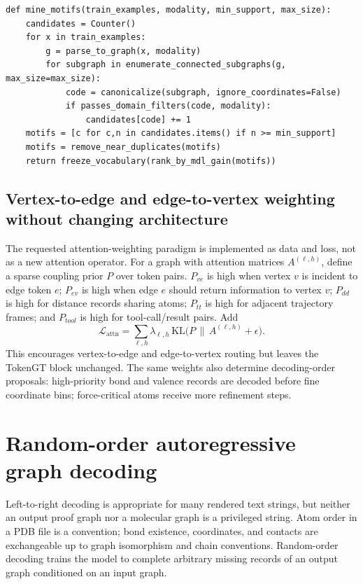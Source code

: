 \documentclass[11pt]{article}
\newcommand{\1}{\mathbf{1}}
\begin{document}
\begin{lstlisting}[caption={Leakage-safe motif mining.}]
def mine_motifs(train_examples, modality, min_support, max_size):
    candidates = Counter()
    for x in train_examples:
        g = parse_to_graph(x, modality)
        for subgraph in enumerate_connected_subgraphs(g, max_size=max_size):
            code = canonicalize(subgraph, ignore_coordinates=False)
            if passes_domain_filters(code, modality):
                candidates[code] += 1
    motifs = [c for c,n in candidates.items() if n >= min_support]
    motifs = remove_near_duplicates(motifs)
    return freeze_vocabulary(rank_by_mdl_gain(motifs))
\end{lstlisting}

\subsection{Vertex-to-edge and edge-to-vertex weighting without changing architecture}

The requested attention-weighting paradigm is implemented as data and loss, not as a new attention operator. For a graph with attention matrices $A^{(\ell,h)}$, define a sparse coupling prior $P$ over token pairs. $P_{ve}$ is high when vertex $v$ is incident to edge token $e$; $P_{ev}$ is high when edge $e$ should return information to vertex $v$; $P_{dd}$ is high for distance records sharing atoms; $P_{tt}$ is high for adjacent trajectory frames; and $P_{tool}$ is high for tool-call/result pairs. Add
\[
  \mathcal L_{\mathrm{attn}} = \sum_{\ell,h}\lambda_{\ell,h}\,\mathrm{KL}\big(P\,\|\,A^{(\ell,h)}+\epsilon\big).
\]
This encourages vertex-to-edge and edge-to-vertex routing but leaves the TokenGT block unchanged. The same weights also determine decoding-order proposals: high-priority bond and valence records are decoded before fine coordinate bins; force-critical atoms receive more refinement steps.

\section{Random-order autoregressive graph decoding}

Left-to-right decoding is appropriate for many rendered text strings, but neither an output proof graph nor a molecular graph is a privileged string. Atom order in a PDB file is a convention; bond existence, coordinates, and contacts are exchangeable up to graph isomorphism and chain conventions. Random-order decoding trains the model to complete arbitrary missing records of an output graph conditioned on an input graph.
\end{document}
